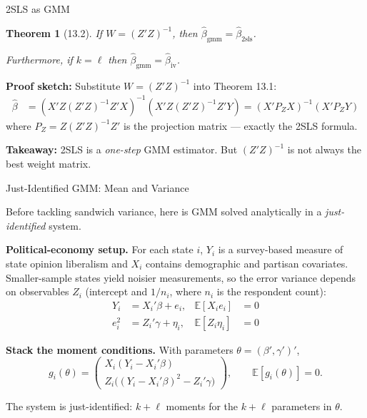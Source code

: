\documentclass[aspectratio=169, handout, t]{beamer}
\newtheorem{thm}{Theorem}
\numberwithin{equation}{section}
\begin{document}
\begin{frame}{2SLS as GMM}

\begin{thm}[13.2]
If $W = (Z'Z)^{-1}$, then $\hat\beta_{\text{gmm}} = \hat\beta_{\text{2sls}}$.

Furthermore, if $k = \ell$ then $\hat\beta_{\text{gmm}} = \hat\beta_{\text{iv}}$.
\end{thm}

\medskip
\textbf{Proof sketch:} Substitute $W = (Z'Z)^{-1}$ into Theorem 13.1:
\begin{align*}
\hat\beta &= (X'Z(Z'Z)^{-1}Z'X)^{-1}(X'Z(Z'Z)^{-1}Z'Y) = (X'P_ZX)^{-1}(X'P_ZY)
\end{align*}
where $P_Z = Z(Z'Z)^{-1}Z'$ is the projection matrix --- exactly the 2SLS formula.

\medskip
\begin{tcolorbox}[colback=blue!5, colframe=blue!50]
\textbf{Takeaway:} 2SLS is a \textit{one-step} GMM estimator. But $(Z'Z)^{-1}$ is not always the best weight matrix.
\end{tcolorbox}

\end{frame}

\begin{frame}{Just-Identified GMM: Mean and Variance}

Before tackling sandwich variance, here is GMM solved analytically in a \emph{just-identified} system.

\medskip
\textbf{Political-economy setup.}  For each state $i$, $Y_i$ is a survey-based measure of state opinion liberalism and $X_i$ contains demographic and partisan covariates.  Smaller-sample states yield noisier measurements, so the error variance depends on observables $Z_i$ (intercept and $1/n_i$, where $n_i$ is the respondent count):
\begin{align*}
Y_i &= X_i'\beta + e_i, & \mathbb{E}[X_i e_i] &= 0 \\
e_i^2 &= Z_i'\gamma + \eta_i, & \mathbb{E}[Z_i \eta_i] &= 0
\end{align*}

\textbf{Stack the moment conditions.}  With parameters $\theta = (\beta', \gamma')'$,
$$g_i(\theta) = \begin{pmatrix} X_i(Y_i - X_i'\beta) \\ Z_i\big((Y_i - X_i'\beta)^2 - Z_i'\gamma\big) \end{pmatrix}, \qquad \mathbb{E}[g_i(\theta)] = 0.$$

The system is just-identified: $k + \ell$ moments for the $k + \ell$ parameters in $\theta$.

\end{frame}
\end{document}
